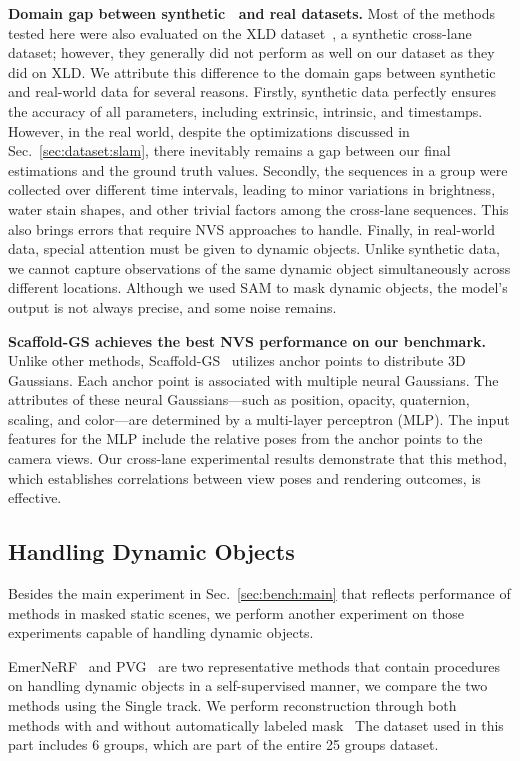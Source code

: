 \noindent \textbf{Domain gap between synthetic~\cite{li2024xld} and real datasets.} Most of the methods tested here were also evaluated on the XLD dataset~\cite{li2024xld}, a synthetic cross-lane dataset; however, they generally did not perform as well on our dataset as they did on XLD. We attribute this difference to the domain gaps between synthetic and real-world data for several reasons. Firstly, synthetic data perfectly ensures the accuracy of all parameters, including extrinsic, intrinsic, and timestamps. However, in the real world, despite the optimizations discussed in Sec.~\ref{sec:dataset:slam}, there inevitably remains a gap between our final estimations and the ground truth values. Secondly, the sequences in a group were collected over different time intervals, leading to minor variations in brightness, water stain shapes, and other trivial factors among the cross-lane sequences. This also brings errors that require NVS approaches to handle. Finally, in real-world data, special attention must be given to dynamic objects. Unlike synthetic data, we cannot capture observations of the same dynamic object simultaneously across different locations. Although we used SAM to mask dynamic objects, the model's output is not always precise, and some noise remains.

\noindent \textbf{Scaffold-GS achieves the best NVS performance on our benchmark.} 
Unlike other methods, Scaffold-GS~\cite{Lu2024scaffoldgs} utilizes anchor points to distribute 3D Gaussians. Each anchor point is associated with multiple neural Gaussians. The attributes of these neural Gaussians—such as position, opacity, quaternion, scaling, and color—are determined by a multi-layer perceptron (MLP). The input features for the MLP include the relative poses from the anchor points to the camera views. Our cross-lane experimental results demonstrate that this method, which establishes correlations between view poses and rendering outcomes, is effective.

\subsection{Handling Dynamic Objects}

Besides the main experiment in Sec.~\ref{sec:bench:main} that reflects performance of methods in masked static scenes, we perform another experiment on those experiments capable of handling dynamic objects.

EmerNeRF~\cite{yang2023emernerf} and PVG~\cite{chen2023pvg} are two representative methods that contain procedures on handling dynamic objects in a self-supervised manner, we compare the two methods using {the Single track. We perform reconstruction through both methods with and without automatically labeled mask~\cite{Kirillov2023sam}}
The dataset used in this part includes 6 groups, which are part of the entire 25 groups dataset.

